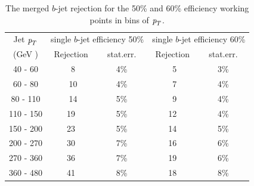 \begin{table}[!hbt] %
\renewcommand{\arraystretch}{1.2}
\centering
\begin{tabular}{ | c || c | c || c | c||}
  \hline
  Jet ${\emph{p}_{T}}$ & \multicolumn{2}{c||}{single $b$-jet efficiency 50\%} & 
            \multicolumn{2}{c||}{single $b$-jet efficiency 60\%}\\ \cline{2-5}
    (GeV )  & Rejection & ~stat.err.~ & Rejection & ~stat.err.~ \\ \hline
   40 - 60 &  ~8 &  4\%  &  ~5  &  3\%    \\ 
   60 - 80 &  ~10 &  4\%  &  ~7  &  4\%    \\ 
   80 - 110&  ~14 &  5\%  &  ~9  &  4\%    \\ 
  110 - 150&  19 &  5\%  &  12  &  4\%    \\ 
  150 - 200&  23 &  5\%  &  14  &  5\%    \\ 
  200 - 270&  30 &  7\%  &  16  &  6\%    \\ 
  270 - 360&  36 &  7\%  &  19  &  6\%    \\ 
  360 - 480&  41 &  8\%  &  18  &  8\%    \\ \hline
\end{tabular}
\caption{The merged $b$-jet rejection for the 50\% and 60\% efficiency working points in bins of ${\emph{p}_{T}}$.}
\label{tb:rejection}
\end{table}





